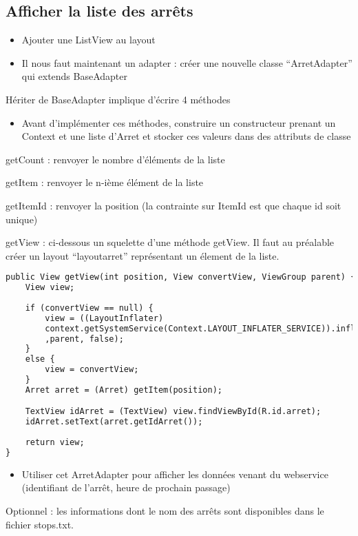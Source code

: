 \documentclass{article}
\begin{document}
\subsection{Afficher la liste des arrêts}
\begin{itemize} 
  \item Ajouter une ListView au layout
  \item Il nous faut maintenant un adapter : créer une nouvelle classe
  ``ArretAdapter'' qui extends BaseAdapter
  \end{itemize}
Hériter de BaseAdapter implique d'écrire 4 méthodes
  \begin{itemize} 
  \item Avant d'implémenter ces méthodes, construire un constructeur prenant un
  Context et une liste d'Arret et stocker ces valeurs dans des attributs de
  classe
 \end{itemize}
 \begin{description}
   \item getCount : renvoyer le nombre d'éléments de la liste
   \item getItem : renvoyer le n-ième élément de la liste
   \item getItemId : renvoyer la position (la contrainte sur ItemId est que
   chaque id soit unique)
   \item getView : ci-dessous un squelette d'une méthode getView. Il faut au
   préalable créer un layout ``layoutarret'' représentant un élement de la
   liste.
 \end{description}
  \begin{lstlisting}[language=XML]
public View getView(int position, View convertView, ViewGroup parent) {
	View view;
	
	if (convertView == null) {
		view = ((LayoutInflater)
		context.getSystemService(Context.LAYOUT_INFLATER_SERVICE)).inflate(R.layout.layoutarret
		,parent, false); 
	} 
	else { 
		view = convertView;
	}
	Arret arret = (Arret) getItem(position);

	TextView idArret = (TextView) view.findViewById(R.id.arret);
	idArret.setText(arret.getIdArret());
	
	return view;
}
\end{lstlisting} 
 \begin{itemize} 
  \item Utiliser cet ArretAdapter pour afficher les données venant du webservice
  (identifiant de l'arrêt, heure de prochain passage)
\end{itemize}
Optionnel : les informations dont le nom des arrêts sont disponibles dans le
fichier stops.txt.
\end{document}

